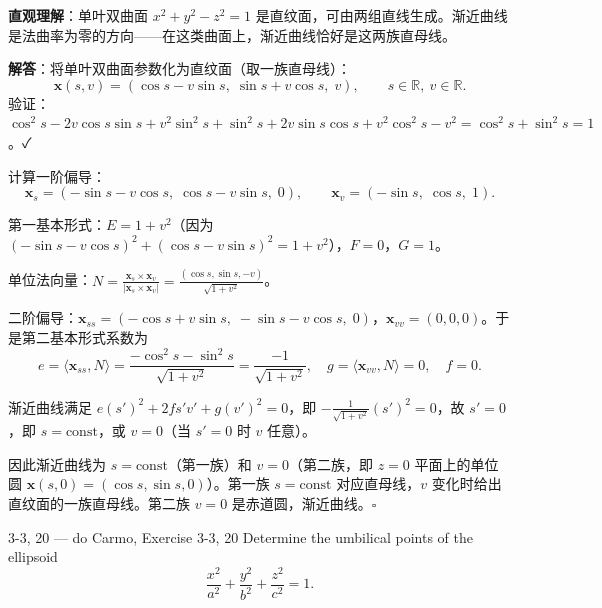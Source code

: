 \begin{solution}
\textbf{直观理解}：单叶双曲面 $x^2+y^2-z^2=1$ 是直纹面，可由两组直线生成。渐近曲线是法曲率为零的方向——在这类曲面上，渐近曲线恰好是这两族直母线。

\textbf{解答}：将单叶双曲面参数化为直纹面（取一族直母线）：
\[
\mathbf{x}(s,v) = (\cos s - v\sin s,\; \sin s + v\cos s,\; v),\qquad s\in\mathbb{R},\ v\in\mathbb{R}.
\]
验证：$\cos^2s-2v\cos s\sin s+v^2\sin^2s+\sin^2s+2v\sin s\cos s+v^2\cos^2s-v^2 = \cos^2s+\sin^2s=1$。✓

计算一阶偏导：
\[
\mathbf{x}_s = (-\sin s - v\cos s,\; \cos s - v\sin s,\; 0),\qquad
\mathbf{x}_v = (-\sin s,\; \cos s,\; 1).
\]

第一基本形式：$E=1+v^2$（因为 $(-\sin s-v\cos s)^2+(\cos s-v\sin s)^2 = 1+v^2$），$F=0$，$G=1$。

单位法向量：$N = \frac{\mathbf{x}_s\times\mathbf{x}_v}{|\mathbf{x}_s\times\mathbf{x}_v|} = \frac{(\cos s, \sin s, -v)}{\sqrt{1+v^2}}$。

二阶偏导：$\mathbf{x}_{ss}=(-\cos s+v\sin s,\; -\sin s-v\cos s,\; 0)$，$\mathbf{x}_{vv}=(0,0,0)$。于是第二基本形式系数为
\[
e = \langle\mathbf{x}_{ss},N\rangle = \frac{-\cos^2s-\sin^2s}{\sqrt{1+v^2}} = \frac{-1}{\sqrt{1+v^2}},\quad
g = \langle\mathbf{x}_{vv},N\rangle = 0,\quad f = 0.
\]

渐近曲线满足 $e(s')^2+2fs'v'+g(v')^2=0$，即 $-\frac{1}{\sqrt{1+v^2}}(s')^2=0$，故 $s'=0$，即 $s=\text{const}$，或 $v=0$（当 $s'=0$ 时 $v$ 任意）。

因此渐近曲线为 $s=\text{const}$（第一族）和 $v=0$（第二族，即 $z=0$ 平面上的单位圆 $\mathbf{x}(s,0)=(\cos s,\sin s,0)$）。第一族 $s=\text{const}$ 对应直母线，$v$ 变化时给出直纹面的一族直母线。第二族 $v=0$ 是赤道圆，渐近曲线。$\square$
\end{solution}

\begin{exercise}{3-3, 20 — do Carmo, Exercise 3-3, 20}
Determine the umbilical points of the ellipsoid
\[
\frac {x ^ {2}}{a ^ {2}} + \frac {y ^ {2}}{b ^ {2}} + \frac {z ^ {2}}{c ^ {2}} = 1.
\]
\end{exercise}

